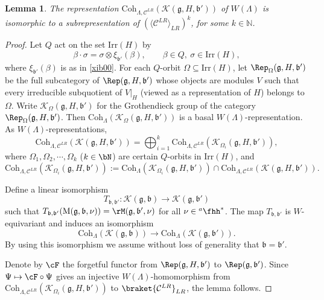 \documentclass[12pt]{amsart}
\def\subset{\subseteq}
\newcommand{\BN}{{\mathbb {N}}}
\newcommand{\CC}{{\mathcal {C}}}
\newcommand{\CK}{{\mathcal {K}}}
\newcommand{\g}{\mathfrak g}
\renewcommand{\b}{\mathfrak b}
\newcommand{\la}{\langle}
\newcommand{\ra}{\rangle}
\numberwithin{equation}{section}
\newtheorem{lem}[thm]{Lemma}
\theoremstyle{remark}
\def\Irr{\mathrm{Irr}}
\def\hha{{}^a\fhh}
\def\Coh{\mathrm{Coh}}
\begin{document}
 \begin{lem}\label{lem0022}
The representation $\Coh_{\Lambda, \CC^{LR}}(\CK(\g,H, \b'))$ of $W(\Lambda)$ is isomorphic to a subrepresentation of $(\la \CC^{LR}\ra_{LR})^k$, for some $k\in \BN$.
     \end{lem}
\begin{proof}


Let $Q$ act on the set $\Irr(H)$ by
\[
   \beta\cdot \sigma=\sigma\otimes \xi_{\b'}(\beta), \qquad\beta\in Q, \ \sigma\in \Irr(H),
\]
where $\xi_{\b'}(\beta)$ is as in \eqref{xib00}.
For each $Q$-orbit $\Omega \subset \Irr(H)$, let $\Rep_{\Omega}(\g,H,\b')$ be the full subcategory of $\Rep(\g,H,\b')$
whose objects are modules $V$ such that every irreducible subquotient of $V|_H$ (viewed as a representation of $H$) belongs to $\Omega$.
Write $\CK_{\Omega}(\g,H,\b')$ for the  Grothendieck group of the category $\Rep_{\Omega}(\g,H,\b')$. Then $\Coh_{\Lambda}(\CK_{\Omega}(\g,H,\b'))$ is a basal $W(\Lambda)$-representation.
As $W(\Lambda)$-representations,
\[
\Coh_{\Lambda, \CC^{LR}}(\CK(\g,H, \b'))=\bigoplus_{i=1}^k
\Coh_{\Lambda, \CC^{LR}}(\CK_{\Omega_i}(\g,H,\b')),
\]
where $\Omega_1, \Omega_2, \cdots, \Omega _k$ ($k\in \bN$) are  certain
$Q$-orbits in $\Irr(H)$, and
\[
\Coh_{\Lambda, \CC^{LR}}(\CK_{\Omega_i}(\g,H,\b')):=\Coh_{\Lambda}(\CK_{\Omega_i}(\g,H,\b'))\cap
\Coh_{\Lambda, \CC^{LR}}(\CK(\g,H, \b')).
\]




Define a linear isomorphism
\[
  T_{\b, \b'}: \CK(\g,\b)\rightarrow \CK(\g,\b')
  \]
  such that $T_{\b,\b'}(\mathrm M(\g,\b,\nu))= \rM(\g,\b',\nu)$ for all $\nu\in \hha^*$.
The map  $ T_{\b, \b'}$ is $W$-equivariant and induces an isomorphism
\[
  \Coh_{\Lambda}(\CK(\g,\b))\rightarrow \Coh_{\Lambda}(\CK(\g,\b')).
\]
By using this isomorphism we  assume without loss of generality that $\b = \b'$.

Denote by $\cF$ the forgetful functor from
$\Rep(\g,H,\b')$ to $\Rep(\g,\b')$.
Since $\Psi\mapsto \cF\circ \Psi$ gives an injective $W(\Lambda)$-homomorphism
from $\Coh_{\Lambda, \CC^{LR}}(\CK_{\Omega_i}(\g,H,\b'))$
to $\braket{\CC^{LR}}_{LR}$,  the lemma follows.
\end{proof}
\end{document}
